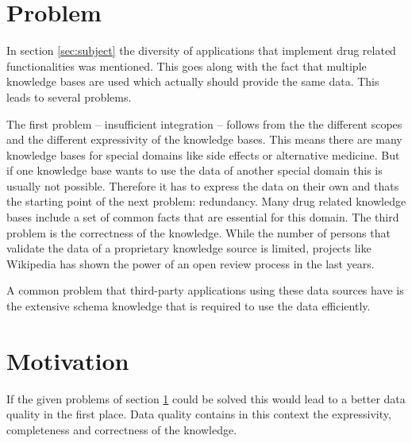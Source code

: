 \section{Problem}
\label{sec:problem}

In section \ref{sec:subject} the diversity of applications that implement drug related functionalities was mentioned.
This goes along with the fact that multiple knowledge bases are used which actually should provide the same data. 
This leads to several problems.

The first problem -- insufficient integration -- follows from the the different scopes and the different expressivity of the knowledge bases.
This means there are many knowledge bases for special domains like side effects or alternative medicine.
But if one knowledge base wants to use the data of another special domain this is usually not possible.
Therefore it has to express the data on their own and thats the starting point of the next problem: redundancy.
Many drug related knowledge bases include a set of common facts that are essential for this domain.
The third problem is the correctness of the knowledge.
While the number of persons that validate the data of a proprietary knowledge source is limited, projects like Wikipedia has shown the power of an open review process in the last years.

A common problem that third-party applications using these data sources have is the extensive schema knowledge that is required to use the data efficiently.

\section{Motivation}
\label{sec:motivation}

If the given problems of section \ref{sec:problem} could be solved this would lead to a better data quality in the first place.
Data quality contains in this context the expressivity, completeness and correctness of the knowledge.

